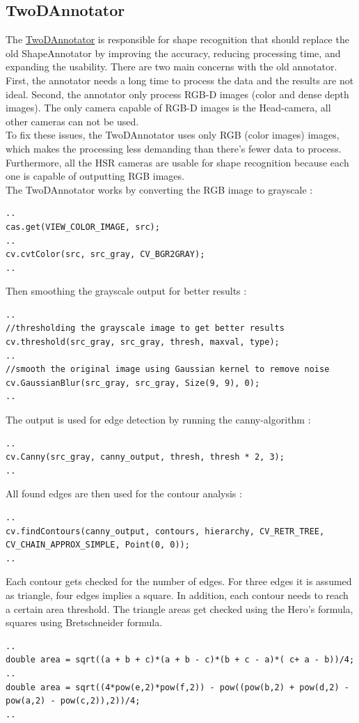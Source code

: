 \documentclass[main.tex]{subfiles}
\begin{document}
				\subsection{TwoDAnnotator}
The \href{https://github.com/SUTURO/suturo_perception/blob/Handcamera_tracking/rs_Athene/src/TwoDAnnotator.cpp}{TwoDAnnotator} is responsible for shape recognition that should replace the old ShapeAnnotator by improving the accuracy, reducing processing time, and expanding the usability. 
There are two main concerns with the old annotator. First, the annotator needs a long time to process the data and the results are not ideal. Second, the annotator only process RGB-D images (color and dense depth images). The only camera capable of RGB-D images is the Head-camera, all other cameras can not be used. \\
To fix these issues, the TwoDAnnotator uses only RGB (color images) images, which makes the processing less demanding than there's fewer data to process. Furthermore, all the HSR cameras are usable for shape recognition because each one is capable of outputting RGB images. \\
The TwoDAnnotator works by converting the RGB image to grayscale :
\begin{lstlisting}
..
cas.get(VIEW_COLOR_IMAGE, src); 
..
cv.cvtColor(src, src_gray, CV_BGR2GRAY);
..
\end{lstlisting}
Then smoothing the grayscale output for better results : 
\begin{lstlisting}
..
//thresholding the grayscale image to get better results
cv.threshold(src_gray, src_gray, thresh, maxval, type);
..
//smooth the original image using Gaussian kernel to remove noise
cv.GaussianBlur(src_gray, src_gray, Size(9, 9), 0);
..
\end{lstlisting}
The output is used for edge detection by running the canny-algorithm : 
\begin{lstlisting}
..
cv.Canny(src_gray, canny_output, thresh, thresh * 2, 3);
..
\end{lstlisting}
All found edges are then used for the contour analysis : 
\begin{lstlisting}
..
cv.findContours(canny_output, contours, hierarchy, CV_RETR_TREE, CV_CHAIN_APPROX_SIMPLE, Point(0, 0));
..
\end{lstlisting}
Each contour gets checked for the number of edges. For three edges it is assumed as triangle, four edges implies a square. In addition, each contour needs to reach a certain area threshold. The triangle areas get checked using the Hero's formula, squares using Bretschneider formula. \\
\begin{lstlisting}
..
double area = sqrt((a + b + c)*(a + b - c)*(b + c - a)*( c+ a - b))/4;
..
double area = sqrt((4*pow(e,2)*pow(f,2)) - pow((pow(b,2) + pow(d,2) - pow(a,2) - pow(c,2)),2))/4;
..
\end{lstlisting}
\end{document}
